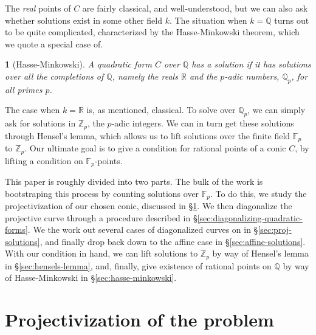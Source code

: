 \documentclass[10pt,a4paper]{amsart}
\numberwithin{equation}{section}
\numberwithin{figure}{section}
\theoremstyle{definition}
\theoremstyle{remark}
\theoremstyle{plain}
\newtheorem{thm}{\protect\theoremname}[section]
\theoremstyle{plain}
\theoremstyle{definition}
\theoremstyle{plain}
\theoremstyle{plain}
\providecommand{\theoremname}{Theorem}
\newcommand{\F}{\mathbb{F}}
\newcommand{\Z}{\mathbb{Z}}
\newcommand{\Q}{\mathbb{Q}}
\newcommand{\R}{\mathbb{R}}
\begin{document}
    The \emph{real} points of $C$ are fairly classical, and well-understood,
    but we can also ask whether solutions exist in some other
    field $k$. The situation when $k=\Q$ turns out to be quite complicated,
    characterized by the Hasse-Minkowski theorem, which we quote a special
    case of.
    \begin{thm}[Hasse-Minkowski]
        A quadratic form $C$ over $\Q$ has a solution if it has solutions
        over all the completions of $\Q$, namely the reals $\R$ and the $p$-adic
        numbers, $\Q_p$, for all primes $p$.
    \end{thm}
    The case when $k = \R$ is, as mentioned, classical. To solve over $\Q_p$,
    we can simply ask for solutions in $\Z_p$, the $p$-adic integers. We
    can in turn get these solutions through Hensel's lemma, which allows us
    to lift solutions over the finite field $\F_p$ to $\Z_p$. Our ultimate
    goal is to give a condition for rational points of a conic $C$, by lifting
    a condition on $\F_p$-points.
    
    This paper is roughly divided into two parts. The bulk of the work 
    is bootstraping this process by counting solutions over $\F_p$. To do this,
    we study the projectivization of our chosen conic, discussed in
    \S\ref{sec:projectivization-of-the-problem}. We  then diagonalize 
    the projective curve through a procedure described in 
    \S\ref{sec:diagonalizing-quadratic-forms}. We the work out several cases
    of diagonalized curves on in \S\ref{sec:proj-solutions}, and finally
    drop back down to the affine case in \S\ref{sec:affine-solutions}.
    With our condition in hand, we can lift solutions to $\Z_p$ by way of
    Hensel's lemma in \S\ref{sec:hensels-lemma}, and, finally, give 
    existence of rational points on $\Q$ by way of Hasse-Minkowski in 
    \S\ref{sec:hasse-minkowski}.
    
    \section{Projectivization of the problem}
    \label{sec:projectivization-of-the-problem} 
\end{document}
